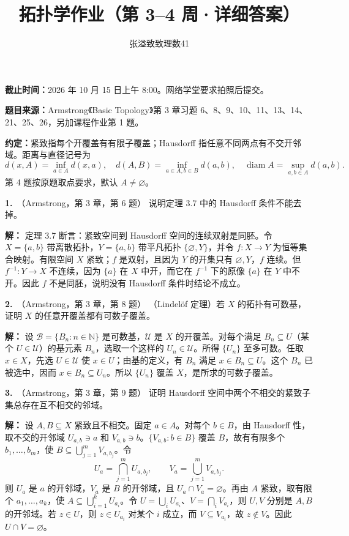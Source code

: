 \documentclass{article}
\title{拓扑学作业（第 3--4 周·详细答案）}
\author{张溢致\quad 致理数41\quad 2024011936}
\date{}
\newcommand{\problem}[2]{\par\medskip\noindent\textbf{#1.}\ （#2）\quad}
\begin{document}
\maketitle
\noindent\textbf{截止时间：}2026 年 10 月 15 日上午 8:00。网络学堂要求拍照后提交。\par
\noindent\textbf{题目来源：}Armstrong《Basic Topology》第 3 章习题 6、8、9、10、11、13、14、21、25、26，另加课程作业第 1 题。\par
\noindent\textbf{约定：}紧致指每个开覆盖有有限子覆盖；Hausdorff 指任意不同两点有不交开邻域。距离与直径记号为
\[
d(x,A)=\inf_{a\in A}d(x,a),\quad
d(A,B)=\inf_{a\in A,b\in B}d(a,b),\quad
\operatorname{diam}A=\sup_{a,b\in A}d(a,b).
\]
第 4 题按原题取点要求，默认 $A\ne\varnothing$。

\problem{1}{Armstrong，第 3 章，第 6 题}
说明定理 3.7 中的 Hausdorff 条件不能去掉。
\par\noindent\textbf{解：}
定理 3.7 断言：紧致空间到 Hausdorff 空间的连续双射是同胚。令 $X=\{a,b\}$ 带离散拓扑，$Y=\{a,b\}$ 带平凡拓扑 $\{\varnothing,Y\}$，并令 $f:X\to Y$ 为恒等集合映射。有限空间 $X$ 紧致；$f$ 是双射，且因为 $Y$ 的开集只有 $\varnothing,Y$，$f$ 连续。但 $f^{-1}:Y\to X$ 不连续，因为 $\{a\}$ 在 $X$ 中开，而它在 $f^{-1}$ 下的原像 $\{a\}$ 在 $Y$ 中不开。因此 $f$ 不是同胚，说明没有 Hausdorff 条件时结论不成立。

\problem{2}{Armstrong，第 3 章，第 8 题}
（Lindelöf 定理）若 $X$ 的拓扑有可数基，证明 $X$ 的任意开覆盖都有可数子覆盖。
\par\noindent\textbf{解：}
设 $\mathcal B=\{B_n:n\in\mathbb N\}$ 是可数基，$\mathcal U$ 是 $X$ 的开覆盖。对每个满足 $B_n\subseteq U$（某个 $U\in\mathcal U$）的基元素 $B_n$，选取一个这样的 $U_n\in\mathcal U$。所得 $\{U_n\}$ 至多可数。任取 $x\in X$，先选 $U\in\mathcal U$ 使 $x\in U$；由基的定义，有 $B_n$ 满足 $x\in B_n\subseteq U$。这个 $B_n$ 已被选中，因而 $x\in B_n\subseteq U_n$。所以 $\{U_n\}$ 覆盖 $X$，是所求的可数子覆盖。

\problem{3}{Armstrong，第 3 章，第 9 题}
证明 Hausdorff 空间中两个不相交的紧致子集总存在互不相交的邻域。
\par\noindent\textbf{解：}
设 $A,B\subseteq X$ 紧致且不相交。固定 $a\in A$。对每个 $b\in B$，由 Hausdorff 性，取不交的开邻域 $U_{a,b}\ni a$ 和 $V_{a,b}\ni b$。$\{V_{a,b}:b\in B\}$ 覆盖 $B$，故有有限多个 $b_1,\ldots,b_m$，使 $B\subseteq\bigcup_{j=1}^mV_{a,b_j}$。令
\[
U_a=\bigcap_{j=1}^mU_{a,b_j},\qquad V_a=\bigcup_{j=1}^mV_{a,b_j}.
\]
则 $U_a$ 是 $a$ 的开邻域，$V_a$ 是 $B$ 的开邻域，且 $U_a\cap V_a=\varnothing$。再由 $A$ 紧致，取有限个 $a_1,\ldots,a_k$，使 $A\subseteq\bigcup_{i=1}^kU_{a_i}$。令 $U=\bigcup_iU_{a_i}$、$V=\bigcap_iV_{a_i}$，则 $U,V$ 分别是 $A,B$ 的开邻域。若 $z\in U$，则 $z\in U_{a_i}$ 对某个 $i$ 成立，而 $V\subseteq V_{a_i}$，故 $z\notin V$。因此 $U\cap V=\varnothing$。
\end{document}
